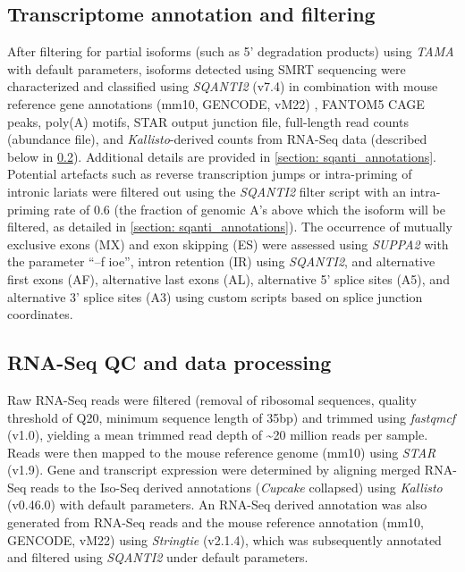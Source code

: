 \subsection{Transcriptome annotation and filtering}
\label{ch4: transcriptome_annotation}
After filtering for partial isoforms (such as 5’ degradation products) using \textit{TAMA} with default parameters, isoforms detected using SMRT sequencing were characterized and classified using \textit{SQANTI2} (v7.4) in combination with mouse reference gene annotations (mm10, GENCODE, vM22) , FANTOM5 CAGE peaks, poly(A) motifs, STAR output junction file, full-length read counts (abundance file), and \textit{Kallisto}-derived counts from RNA-Seq data (described below in \cref{ch4: rnaseq_processing}). Additional details are provided in \cref{section: sqanti_annotations}. Potential artefacts such as reverse transcription jumps or intra-priming of intronic lariats were filtered out using the \textit{SQANTI2} filter script with an intra-priming rate of 0.6 (the fraction of genomic A's above which the isoform will be filtered, as detailed in \cref{section: sqanti_annotations}). The occurrence of mutually exclusive exons (MX) and exon skipping (ES) were assessed using \textit{SUPPA2}\cite{Trincado2018} with the parameter “–f ioe”, intron retention (IR) using \textit{SQANTI2}, and alternative first exons (AF), alternative last exons (AL), alternative 5’ splice sites (A5), and alternative 3’ splice sites (A3) using custom scripts based on splice junction coordinates. 

\subsection{RNA-Seq QC and data processing}
\label{ch4: rnaseq_processing}
Raw RNA-Seq reads were filtered (removal of ribosomal sequences, quality threshold of Q20, minimum sequence length of 35bp) and trimmed using \textit{fastqmcf} (v1.0), yielding a mean trimmed read depth of \textasciitilde20 million reads per sample. Reads were then mapped to the mouse reference genome (mm10) using \textit{STAR}\cite{Dobin2013} (v1.9). Gene and transcript expression were determined by aligning merged RNA-Seq reads to the Iso-Seq derived annotations (\textit{Cupcake} collapsed) using \textit{Kallisto}\cite{Bray2016} (v0.46.0) with default parameters. An RNA-Seq derived annotation was also generated from RNA-Seq reads and the mouse reference annotation (mm10, GENCODE, vM22) using \textit{Stringtie}\cite{Pertea2015} (v2.1.4), which was subsequently annotated and filtered using \textit{SQANTI2} under default parameters. 

